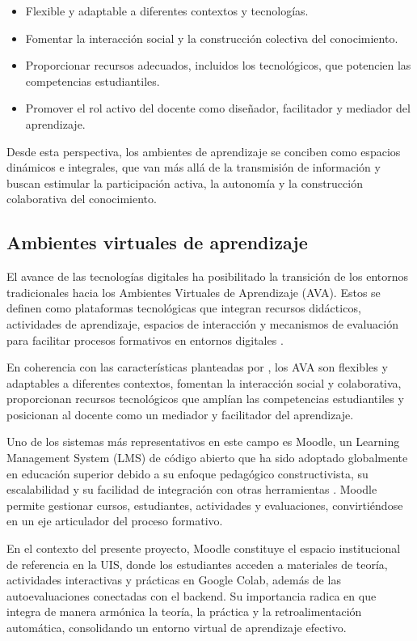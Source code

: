 \documentclass[letter,oneside,12pt,spanish]{report}
\begin{document}
\begin{itemize}
	\item Flexible y adaptable a diferentes contextos y tecnologías.
	\item Fomentar la interacción social y la construcción colectiva del conocimiento.
	\item Proporcionar recursos adecuados, incluidos los tecnológicos, que potencien las competencias estudiantiles.
	\item Promover el rol activo del docente como diseñador, facilitador y mediador del aprendizaje.
\end{itemize}

Desde esta perspectiva, los ambientes de aprendizaje se conciben como espacios dinámicos e integrales, que van más allá de la transmisión de información y buscan estimular la participación activa, la autonomía y la construcción colaborativa del conocimiento.

\subsection{Ambientes virtuales de aprendizaje}

El avance de las tecnologías digitales ha posibilitado la transición de los entornos tradicionales hacia los Ambientes Virtuales de Aprendizaje (AVA). Estos se definen como plataformas tecnológicas que integran recursos didácticos, actividades de aprendizaje, espacios de interacción y mecanismos de evaluación para facilitar procesos formativos en entornos digitales \parencite{salinas2004}.

En coherencia con las características planteadas por \textcite{castro2019}, los AVA son flexibles y adaptables a diferentes contextos, fomentan la interacción social y colaborativa, proporcionan recursos tecnológicos que amplían las competencias estudiantiles y posicionan al docente como un mediador y facilitador del aprendizaje.

Uno de los sistemas más representativos en este campo es Moodle, un Learning Management System (LMS) de código abierto que ha sido adoptado globalmente en educación superior debido a su enfoque pedagógico constructivista, su escalabilidad y su facilidad de integración con otras herramientas \parencite{dougiamas2003}. Moodle permite gestionar cursos, estudiantes, actividades y evaluaciones, convirtiéndose en un eje articulador del proceso formativo.

En el contexto del presente proyecto, Moodle constituye el espacio institucional de referencia en la UIS, donde los estudiantes acceden a materiales de teoría, actividades interactivas y prácticas en Google Colab, además de las autoevaluaciones conectadas con el backend. Su importancia radica en que integra de manera armónica la teoría, la práctica y la retroalimentación automática, consolidando un entorno virtual de aprendizaje efectivo.
\end{document}
